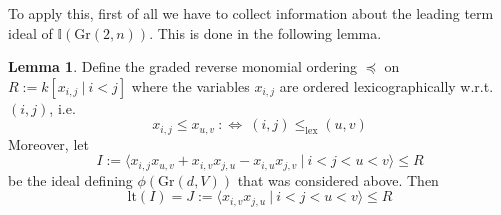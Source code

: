 \documentclass{scrartcl}
\newcommand{\I}{\mathbb{I}}
\newcommand{\Gr}{\mathrm{Gr}}
\theoremstyle{definition}
\newtheorem{lemma}[subsection]{Lemma}
\begin{document}
To apply this, first of all we have to collect information about the leading term ideal of $\I(\Gr(2, n))$.
This is done in the following lemma.
\begin{lemma}
    \label{prop:leading_term_ideal_grassmanian}
    Define the graded reverse monomial ordering $\preceq$ on $R := k[x_{i, j} \ | \ i < j]$ where the variables $x_{i, j}$ are ordered lexicographically w.r.t. $(i, j)$, i.e.
    \begin{equation*}
        x_{i, j} \leq x_{u, v} \ :\Leftrightarrow \ (i, j) \leq_{\text{lex}} (u, v)
    \end{equation*}
    Moreover, let
    \begin{equation*}
        I := \langle x_{i, j}x_{u, v} + x_{i, v}x_{j, u} - x_{i, u}x_{j, v} \ | \ i < j < u < v \rangle \leq R
    \end{equation*}
    be the ideal defining $\phi(\Gr(d, V))$ that was considered above. Then
    \begin{equation*}
        \mathrm{lt}(I) = J := \langle x_{i, v} x_{j, u} \ | \ i < j < u < v \rangle \leq R
    \end{equation*}
\end{lemma}
\end{document}
